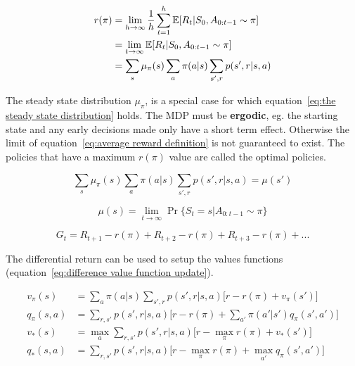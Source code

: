\begin{equation}
\begin{split}
r(\pi) & = \lim\limits_{h \rightarrow \infty} \frac{1}{h}\sum_{t=1}^{h} \operatorname{\mathbb{E}}[R_t | S_0, A_{0:t-1} \sim \pi] \\
& = \lim_{t \rightarrow \infty} \operatorname{\mathbb{E}}[R_t | S_0, A_{0:t-1} \sim \pi] \\
& = \sum_s \mu_{\pi}(s)\sum_a \pi(a|s) \sum_{s', r}p(s', r| s, a)
\end{split}
\label{eq:average reward definition}
\end{equation}

The steady state distribution $\mu_{\pi}$, is a special case for which equation~\ref{eq:the steady state distribution} holds. The MDP must be \textbf{ergodic}, eg. the starting state and any early decisions made only have a short term effect. Otherwise the limit of equation~\ref{eq:average reward definition} is not guaranteed to exist. The policies that have a maximum $r(\pi)$ value are called the optimal policies.

\begin{equation}
\sum_s \mu_{\pi}(s)\sum_a \pi(a|s) \sum_{s', r}p(s', r| s, a)=\mu(s')
\label{eq:the steady state distribution}
\end{equation}

\begin{equation}
\mu(s) = \lim_{t \rightarrow \infty} \Pr\{S_t = s | A_{0:t-1} \sim \pi\} 
\end{equation}

\begin{equation}
G_t = R_{t+1} - r(\pi) + R_{t+2} - r(\pi) + R_{t+3} - r(\pi) + ...
\label{eq:differential return}
\end{equation}

The differential return can be used to setup the values functions (equation~\ref{eq:difference value function update}). 

\begin{equation}
\begin{split}
v_{\pi}(s) & = \sum_a \pi(a|s) \sum_{s',r}p(s',r|s, a)\big[ r - r(\pi) + v_{\pi}(s') \big] \\
q_{\pi}(s, a) & = \sum_{r, s'} p(s', r | s, a)\Big[ r - r(\pi) + \sum_{a'}\pi(a' | s')q_{\pi}(s', a') \Big] \\
v_*(s) & = \max_a \sum_{r, s'} p(s', r | s, a)\Big[ r - \max_{\pi}r(\pi) + v_*(s') \Big] \\
q_*(s, a) & = \sum_{r, s'} p(s', r | s, a)\Big[ r - \max_{\pi}r(\pi) + \max_{a'}q_{\pi}(s', a') \Big] \\
\end{split}
\label{eq:differential value functions}
\end{equation}

